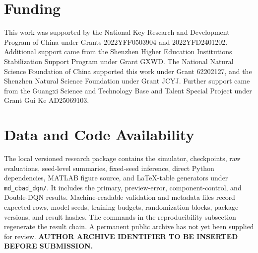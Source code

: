 \documentclass[11pt]{article}
\begin{document}
\section*{Funding}

This work was supported by the National Key Research and Development Program of China under Grants 2022YFF0503904 and 2022YFD2401202. Additional support came from the Shenzhen Higher Education Institutions Stabilization Support Program under Grant GXWD. The National Natural Science Foundation of China supported this work under Grant 62202127, and the Shenzhen Natural Science Foundation under Grant JCYJ. Further support came from the Guangxi Science and Technology Base and Talent Special Project under Grant Gui Ke AD25069103.

\section*{Data and Code Availability}

\color{red}%
The local versioned research package contains the simulator, checkpoints, raw evaluations, seed-level summaries, fixed-seed inference, direct Python dependencies, MATLAB figure source, and LaTeX-table generators under \texttt{md\_cbad\_dqn/}. It includes the primary, preview-error, component-control, and Double-DQN results. Machine-readable validation and metadata files record expected rows, model seeds, training budgets, randomization blocks, package versions, and result hashes. The commands in the reproducibility subsection regenerate the result chain. A permanent public archive has not yet been supplied for review. \textbf{AUTHOR ARCHIVE IDENTIFIER TO BE INSERTED BEFORE SUBMISSION.}
\color{black}%

\begingroup
\small
\setlength{\itemsep}{0.2em}


\endgroup
\end{document}
